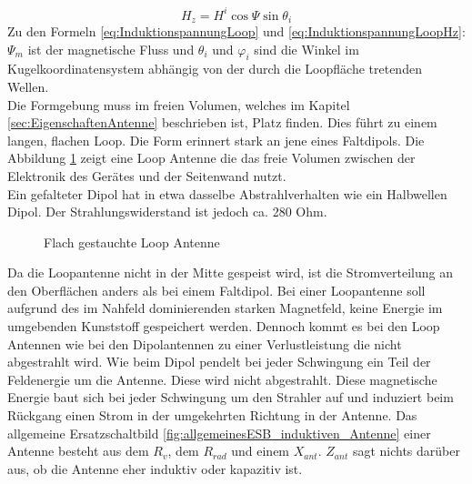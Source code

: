 \begin{equation}\label{eq:InduktionspannungLoopHz}
H_{z}=H^{i}\cos\Psi\sin\theta_{i}
\end{equation}
Zu den Formeln \ref{eq:InduktionspannungLoop} und \ref{eq:InduktionspannungLoopHz}: \\
$\Psi_{m}$ ist der magnetische Fluss und $\theta_{i}$ und $\varphi_{i}$  sind die Winkel im Kugelkoordinatensystem abhängig von der durch die Loopfläche tretenden Wellen.\\ 
Die Formgebung muss im freien Volumen, welches im Kapitel \ref{sec:EigenschaftenAntenne} beschrieben ist, Platz finden. Dies führt zu einem langen, flachen Loop. Die Form erinnert stark an jene eines Faltdipols. Die Abbildung \ref{fig:FflacheLoopAntenne} zeigt eine Loop Antenne die das freie Volumen zwischen der Elektronik des Gerätes und der Seitenwand nutzt.\\
Ein gefalteter Dipol hat in etwa dasselbe Abstrahlverhalten wie ein Halbwellen Dipol. Der Strahlungswiderstand ist jedoch  ca.  280 Ohm. 

\begin{figure}[!ht]
	\begin{center}
	\end{center}
\caption{Flach gestauchte Loop Antenne}
\label{fig:FflacheLoopAntenne}
\end{figure}

Da  die Loopantenne nicht in der Mitte gespeist wird, ist die Stromverteilung an den Oberflächen anders als bei einem Faltdipol. Bei einer Loopantenne soll aufgrund des im Nahfeld dominierenden starken Magnetfeld, keine Energie im umgebenden Kunststoff gespeichert werden. Dennoch kommt es bei den Loop Antennen wie bei den Dipolantennen zu einer Verlustleistung die nicht abgestrahlt wird. Wie beim Dipol pendelt bei jeder Schwingung ein Teil der Feldenergie um die Antenne. Diese wird nicht abgestrahlt. Diese magnetische Energie baut sich bei jeder Schwingung um den Strahler auf und induziert beim Rückgang einen Strom in der umgekehrten Richtung in der Antenne. Das allgemeine Ersatzschaltbild \ref{fig:allgemeinesESB_induktiven_Antenne} einer Antenne besteht aus dem $R_{v}$, dem $R_{rad}$ und einem $X_{ant}$. $Z_{ant}$ sagt nichts darüber aus, ob die Antenne eher induktiv oder kapazitiv ist.



